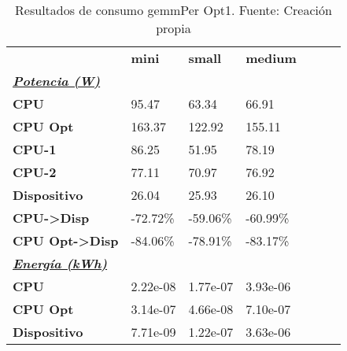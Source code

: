 \begin{table}[H]
    \centering
    \begin{tabular}{lllllll}
    \rowcolor[HTML]{DAE8FC} \ & \textbf{mini} & \textbf{	small} & \textbf{	medium} \\
    \cellcolor[HTML]{DAE8FC} \textbf{\textbf{{\emph{{\underline{{Potencia (W)}}}}}}} &  & 	 & 	 \\
    \rowcolor[HTML]{EFEFEF} \cellcolor[HTML]{DAE8FC} \textbf{CPU} & 95.47 & 	63.34 & 	66.91 \\
    \cellcolor[HTML]{DAE8FC} \textbf{CPU Opt} & 163.37 & 	122.92 & 	155.11 \\
    \rowcolor[HTML]{EFEFEF} \cellcolor[HTML]{DAE8FC} \textbf{\quad CPU-1} & 86.25 & 	51.95 & 	78.19 \\
    \cellcolor[HTML]{DAE8FC} \textbf{\quad CPU-2} & 77.11 & 	70.97 & 	76.92 \\
    \rowcolor[HTML]{EFEFEF} \cellcolor[HTML]{DAE8FC} \textbf{Dispositivo} & 26.04 & 	25.93 & 	26.10 \\
    \cellcolor[HTML]{DAE8FC} \textbf{CPU->Disp} & -72.72\% & 	-59.06\% & 	-60.99\% \\
    \rowcolor[HTML]{EFEFEF} \cellcolor[HTML]{DAE8FC} \textbf{CPU Opt->Disp} & -84.06\% & 	-78.91\% & 	-83.17\% \\
    \cellcolor[HTML]{DAE8FC} \textbf{\textbf{{\emph{{\underline{{Energía (kWh)}}}}}}} &  & 	 & 	 \\
    \rowcolor[HTML]{EFEFEF} \cellcolor[HTML]{DAE8FC} \textbf{CPU} & 2.22e-08 & 	1.77e-07 & 	3.93e-06 \\
    \cellcolor[HTML]{DAE8FC} \textbf{CPU Opt} & 3.14e-07 & 	4.66e-08 & 	7.10e-07 \\
    \rowcolor[HTML]{EFEFEF} \cellcolor[HTML]{DAE8FC} \textbf{Dispositivo} & 7.71e-09 & 	1.22e-07 & 	3.63e-06 \\
    \end{tabular}
    \caption[Resultados de consumo gemmPer Opt1]{{Resultados de consumo gemmPer Opt1. Fuente: Creación propia}}
    \label{table_test_gemmPer_Opt1_hw_powerResults}
\end{table}